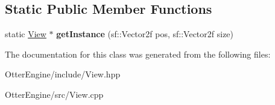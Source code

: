 \subsection*{Static Public Member Functions}
\begin{DoxyCompactItemize}
\item 
static \hyperlink{class_otter_engine_1_1_view}{View} $\ast$ {\bfseries get\+Instance} (sf\+::\+Vector2f pos, sf\+::\+Vector2f size)\hypertarget{class_otter_engine_1_1_view_a82b3929863b6699affe525c9dc6da22d}{}\label{class_otter_engine_1_1_view_a82b3929863b6699affe525c9dc6da22d}

\end{DoxyCompactItemize}


The documentation for this class was generated from the following files\+:\begin{DoxyCompactItemize}
\item 
Otter\+Engine/include/View.\+hpp\item 
Otter\+Engine/src/View.\+cpp\end{DoxyCompactItemize}
